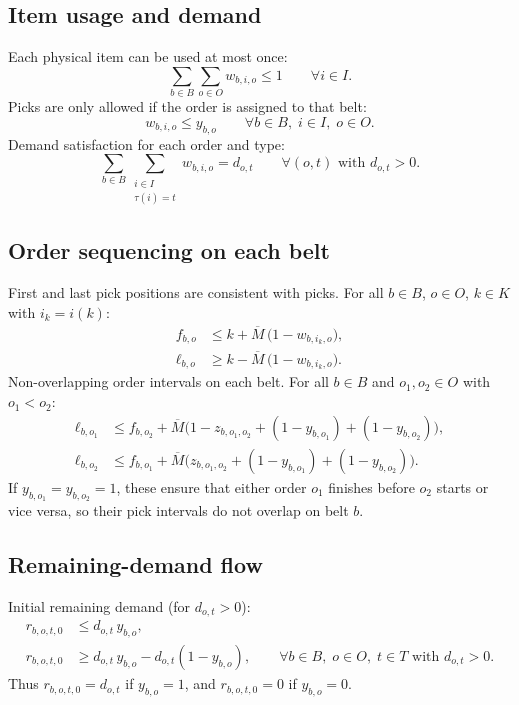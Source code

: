 \documentclass[11pt]{article}
\begin{document}
\subsection{Item usage and demand}
Each physical item can be used at most once:
\begin{equation}
  \sum_{b \in B} \sum_{o \in O} w_{b,i,o} \le 1
  \qquad \forall i \in I.
\end{equation}
Picks are only allowed if the order is assigned to that belt:
\begin{equation}
  w_{b,i,o} \le y_{b,o}
  \qquad \forall b \in B,\; i \in I,\; o \in O.
\end{equation}
Demand satisfaction for each order and type:
\begin{equation}
  \sum_{b \in B} \sum_{\substack{i \in I \\ \tau(i)=t}} w_{b,i,o}
  = d_{o,t}
  \qquad \forall (o,t) \text{ with } d_{o,t} > 0.
\end{equation}

\subsection{Order sequencing on each belt}
First and last pick positions are consistent with picks. For all $b \in B$, $o \in O$, $k \in K$ with $i_k = i(k)$:
\begin{align}
  f_{b,o} &\le k + \overline{M}\,\bigl( 1 - w_{b,i_k,o} \bigr), \\
  \ell_{b,o} &\ge k - \overline{M}\,\bigl( 1 - w_{b,i_k,o} \bigr).
\end{align}
Non-overlapping order intervals on each belt. For all $b \in B$ and $o_1,o_2 \in O$ with $o_1 < o_2$:
\begin{align}
  \ell_{b,o_1} &\le
  f_{b,o_2}
  +
  \overline{M}
  \bigl(
    1 - z_{b,o_1,o_2}
    + (1 - y_{b,o_1})
    + (1 - y_{b,o_2})
  \bigr), \\
  \ell_{b,o_2} &\le
  f_{b,o_1}
  +
  \overline{M}
  \bigl(
    z_{b,o_1,o_2}
    + (1 - y_{b,o_1})
    + (1 - y_{b,o_2})
  \bigr).
\end{align}
If $y_{b,o_1}=y_{b,o_2}=1$, these ensure that either order $o_1$ finishes before $o_2$ starts or vice versa, so their pick intervals do not overlap on belt $b$.

\subsection{Remaining-demand flow}
Initial remaining demand (for $d_{o,t}>0$):
\begin{align}
  r_{b,o,t,0} &\le d_{o,t}\, y_{b,o},
  \\
  r_{b,o,t,0} &\ge d_{o,t}\, y_{b,o} - d_{o,t} (1 - y_{b,o}),
  \qquad \forall b \in B,\; o \in O,\; t \in T \text{ with } d_{o,t}>0.
\end{align}
Thus $r_{b,o,t,0}=d_{o,t}$ if $y_{b,o}=1$, and $r_{b,o,t,0}=0$ if $y_{b,o}=0$.
\end{document}
